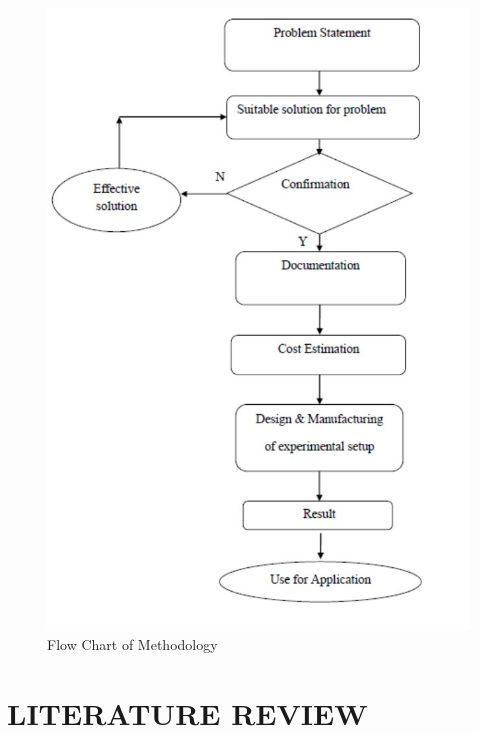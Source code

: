 \documentclass[16pt,a4paper]{article}
\begin{document}
\begin{figure}[h]
\centering
\includegraphics[scale=0.5]{methodology}
\caption{Flow Chart of Methodology}
\label{fig:methodology}
\end{figure}

\pagebreak

\section{LITERATURE REVIEW}
\end{document}
